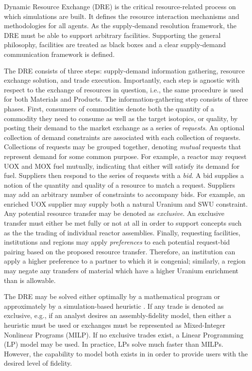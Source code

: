 Dynamic Resource Exchange (DRE) is the critical resource-related process on
which \Cyclus simulations are built. It defines the resource interaction
mechanisms and methodologies for all agents. As the \Cyclus supply-demand
resolution framework, the DRE must be able to support arbitrary
facilities. Supporting the general \Cyclus philosophy, facilities are treated as
black boxes and a clear supply-demand communication framework is defined.

The DRE consists of three steps: supply-demand information gathering, resource
exchange solution, and trade execution. Importantly, each step is agnostic with
respect to the exchange of resources in question, i.e., the same procedure is
used for both Materials and Products. The information-gathering step consists of
three phases. First, consumers of commodities denote both the quantity of a
commodity they need to consume as well as the target isotopics, or quality, by
posting their demand to the market exchange as a series of \textit{requests}. An
optional collection of demand constraints are associated with each collection of
requests. Collections of requests may be grouped together, denoting
\textit{mutual} requests that represent demand for some common purpose. For
example, a reactor may request UOX and MOX fuel mutually, indicating that either
will satisfy its demand for fuel. Suppliers then respond to the series of
requests with a \textit{bid}. A bid supplies a notion of the quantity and
quality of a resource to match a request. Suppliers may add an arbitrary number
of constraints to accompany bids. For example, an enriched UOX supplier may
supply both a natural Uranium and SWU constraint. Any potential resource
transfer may be denoted as \textit{exclusive}. An exclusive transfer must either
be met fully or not at all in order to support concepts such as the the trading
of individual reactor assemblies. Finally, requesting facilities, institutions
and regions may apply \textit{preferences} to each potential request-bid pairing
based on the proposed resource transfer. Therefore, an institution can apply a
higher preference to a partner to which it is congenial; similarly, a region may
negate any transfers of material which have a higher Uranium enrichment than is
allowable.

The DRE may be solved either optimally by a mathematical program or
approximately by a simulation-based heuristic . If any trade is
denoted as exclusive, e.g., if an analyst desires an assembly-fidelity model,
then either a heuristic must be used or exchanges must be represented as
Mixed-Integer Nonlinear Programs (MILP). If no exclusive trades exist, a Linear
Programming (LP) model may be used. In practice, LPs solve much faster than
MILPs. However, the capability to model both exists in \Cyclus in order to
provide users with the desired level of fidelity.

